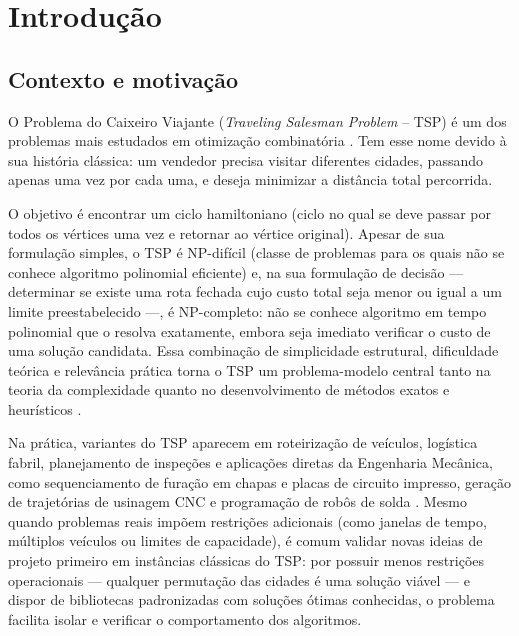 \chapter{Introdução}\label{cap1-introducao}

\section{Contexto e motivação}\label{sec-11-contexto-e-motivacao}

O Problema do Caixeiro Viajante (\emph{Traveling Salesman Problem} -- TSP) é um dos problemas mais estudados em otimização combinatória \autocite{cook2012pursuit}.
Tem esse nome devido à sua história clássica: um vendedor precisa visitar diferentes cidades, passando apenas uma vez por cada uma, e deseja minimizar a distância total percorrida.

O objetivo é encontrar um ciclo hamiltoniano (ciclo no qual se deve passar por todos os vértices uma vez e retornar ao vértice original).
Apesar de sua formulação simples, o TSP é NP-difícil (classe de problemas para os quais não se conhece algoritmo polinomial eficiente) e, na sua formulação de decisão --- determinar se existe uma rota fechada cujo custo total seja menor ou igual a um limite preestabelecido ---, é NP-completo: não se conhece algoritmo em tempo polinomial que o resolva exatamente, embora seja imediato verificar o custo de uma solução candidata.
Essa combinação de simplicidade estrutural, dificuldade teórica e relevância prática torna o TSP um problema-modelo central tanto na teoria da complexidade quanto no desenvolvimento de métodos exatos e heurísticos \autocite{cook2012pursuit}.

Na prática, variantes do TSP aparecem em roteirização de veículos, logística fabril, planejamento de inspeções e aplicações diretas da Engenharia Mecânica, como sequenciamento de furação em chapas e placas de circuito impresso, geração de trajetórias de usinagem CNC e programação de robôs de solda \autocite{cook2012pursuit}.
Mesmo quando problemas reais impõem restrições adicionais (como janelas de tempo, múltiplos veículos ou limites de capacidade), é comum validar novas ideias de projeto primeiro em instâncias clássicas do TSP: por possuir menos restrições operacionais --- qualquer permutação das cidades é uma solução viável --- e dispor de bibliotecas padronizadas com soluções ótimas conhecidas, o problema facilita isolar e verificar o comportamento dos algoritmos.

